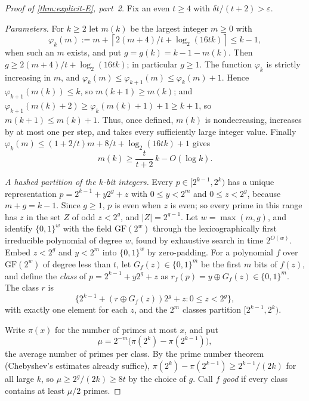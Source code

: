 \documentclass[11pt]{article}
\theoremstyle{definition}
\theoremstyle{remark}
\newcommand{\bits}{\{0,1\}}
\newcommand{\ceil}[1]{\left\lceil #1\right\rceil}
\numberwithin{equation}{section}
\begin{document}
\begin{proof}[Proof of \cref{thm:explicit-E}, part~2]
Fix an even $t\geq4$ with $\delta t/(t+2)>\varepsilon$.

\emph{Parameters.}  For $k\geq2$ let $m(k)$ be the largest integer
$m\geq0$ with
\[
  \varphi_k(m):=m+\ceil{2(m+4)/t+\log_2(16tk)}\leq k-1,
\]
when such an $m$ exists, and put $g=g(k)=k-1-m(k)$.  Then
$g\geq 2(m+4)/t+\log_2(16tk)$; in particular $g\geq1$.  The function
$\varphi_k$ is strictly increasing in $m$, and
$\varphi_k(m)\leq\varphi_{k+1}(m)\leq\varphi_k(m)+1$.  Hence
$\varphi_{k+1}(m(k))\leq k$, so $m(k+1)\geq m(k)$; and
$\varphi_{k+1}(m(k)+2)\geq\varphi_k(m(k)+1)+1\geq k+1$, so
$m(k+1)\leq m(k)+1$.  Thus, once defined, $m(k)$ is nondecreasing,
increases by at most one per step, and takes every sufficiently large
integer value.  Finally
$\varphi_k(m)\leq(1+2/t)m+8/t+\log_2(16tk)+1$ gives
\begin{equation}\label{eq:mk-lower}
  m(k)\geq\frac{t}{t+2}\,k-O(\log k).
\end{equation}

\emph{A hashed partition of the $k$-bit integers.}  Every
$p\in[2^{k-1},2^k)$ has a unique representation
$p=2^{k-1}+y2^g+z$ with $0\leq y<2^m$ and $0\leq z<2^g$, because
$m+g=k-1$.  Since $g\geq1$, $p$ is even when $z$ is even; so every
prime in this range has $z$ in the set $Z$ of odd $z<2^g$, and
$|Z|=2^{g-1}$.  Let $w=\max(m,g)$, and identify $\bits^w$ with the field
$\mathrm{GF}(2^w)$ through the lexicographically first irreducible
polynomial of degree $w$, found by exhaustive search in time $2^{O(w)}$.
Embed $z<2^g$ and $y<2^m$ into $\bits^w$ by zero-padding.  For a
polynomial $f$ over $\mathrm{GF}(2^w)$ of degree less than $t$, let
$G_f(z)\in\bits^m$ be the first $m$ bits of $f(z)$, and define the
\emph{class} of $p=2^{k-1}+y2^g+z$ as $r_f(p)=y\oplus G_f(z)\in\bits^m$.
The class $r$ is
\[
  \bigl\{2^{k-1}+(r\oplus G_f(z))2^g+z:0\leq z<2^g\bigr\},
\]
with exactly one element for each $z$, and the $2^m$ classes partition
$[2^{k-1},2^k)$.

Write $\pi(x)$ for the number of primes at most $x$, and put
\[
  \mu=2^{-m}\bigl(\pi(2^k)-\pi(2^{k-1})\bigr),
\]
the average number of primes per class.  By the prime number theorem
(Chebyshev's estimates already suffice), $\pi(2^k)-\pi(2^{k-1})\geq
2^{k-1}/(2k)$ for all large $k$, so $\mu\geq 2^g/(2k)\geq 8t$ by the
choice of $g$.  Call $f$ \emph{good} if every class contains at least
$\mu/2$ primes.


\end{proof}
\end{document}
